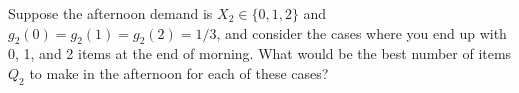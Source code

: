 \begin{exercise}
Suppose the afternoon demand is $X_2\in \{0,1,2\}$ and $g_2(0)=g_2(1)=g_2(2)=1/3$, and consider the cases where you end up with 0, 1, and 2 items at the end of morning. What would be the best number of items $Q_2$ to make in the afternoon for each of these cases?

\end{exercise}

